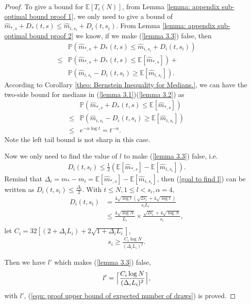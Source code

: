 \begin{proof}
To give a bound for $\mathbb{E}[T_i\left(N\right)]$, from Lemma \ref{lemma: appendix sub-optimal bound proof 1}, we only need to give a bound of $\hat{m}_{*, s} +  D_*(t, s)  \leq \hat{m}_{i, s_i} +  D_i(t, s_i)$. From Lemma \ref{lemma: appendix sub-optimal bound proof 2} we know, if we make (\ref{lemma 3.3}) false, then
\begin{align}
    & \mathbb{P}\left(\hat{m}_{*, s} +  D_*(t, s)  \leq \hat{m}_{i, s_i} +  D_i(t, s_i)\right) \\
    \leq &  \mathbb{P}\left(\hat{m}_{*, s} +  D_*(t, s) \leq  \mathbb{E}[\hat{m}_{*, s}]\right) + \nonumber \\ & \mathbb{P}\left(\hat{m}_{i, s_i} -  D_i(t, s_i) \geq \mathbb{E}[\hat{m}_{i, s_i}]\right).
\end{align}
According to Corollary \ref{theo: Bernstein Inequality for Medians.}, we can have the two-side bound for medians in (\ref{lemma 3.1})(\ref{lemma 3.2}) as
    \begin{align}
        & \mathbb{P}\left(\hat{m}_{*, s} +  D_*(t, s) \leq  \mathbb{E}[\hat{m}_{*, s}]\right)\\ \leq & \mathbb{P}\left(\hat{m}_{i, s_i} -  D_i(t, s_i) \geq \mathbb{E}[\hat{m}_{i, s_i}]\right)\\
        \leq &  e^{-\alpha \log t} = t^{-\alpha}.
    \end{align}
Note the left tail bound is not sharp in this case.

    Now we only need to find the value of $l$ to make (\ref{lemma 3.3}) false, i.e.
    \begin{align}
    \label{goal to find l}
        D_i(t, s_i) \leq  \frac{1}{2 }\left(\mathbb{E}[\hat{m}_{*, s}] - \mathbb{E}[\hat{m}_{i, s_i}]\right).
    \end{align}
    Remind that $\Delta_{i} = m_* - m_i = \mathbb{E}[\hat{m}_{*, s}] - \mathbb{E}[\hat{m}_{i, s_i}]$, then (\ref{goal to find l}) can be written as $D_i(t, s_i) \leq  \frac{\Delta_{i}}{2 }$. With $t \leq N, 1 \leq l < s_i, \alpha = 4$,
    \begin{align}
        D_i(t, s_i) &= \frac{4 \sqrt{\log t} \left( \sqrt{ 2s_i} + 4\sqrt{\log t}\right)}{s_i L_{i}}\\
        & \leq \frac{4 \sqrt{\log N}}{ L_{i}} \times \frac{\sqrt{2s_i} + 4\sqrt{\log N}}{s_i},\\
    \end{align}
    let $ C_{i} = 32 \left[(2 + \Delta_i L_{i}) + 2\sqrt{1 + \Delta_i L_{i}}\right]$,
    \begin{align}
        s_i \geq \frac{ C_{i} \log N}{(\Delta_i L_{i})^2}.
    \end{align}

    Then we have $l'$ which makes (\ref{lemma 3.3}) false,
   \begin{align}
       l' = \Bigl\lceil \frac{ C_{i} \log N}{(\Delta_i L_{i})^2}  \Bigr\rceil,
   \end{align}
   with $l'$, (\ref{equ: proof upper bound of expected number of draws}) is proved. 
 \end{proof}
   

